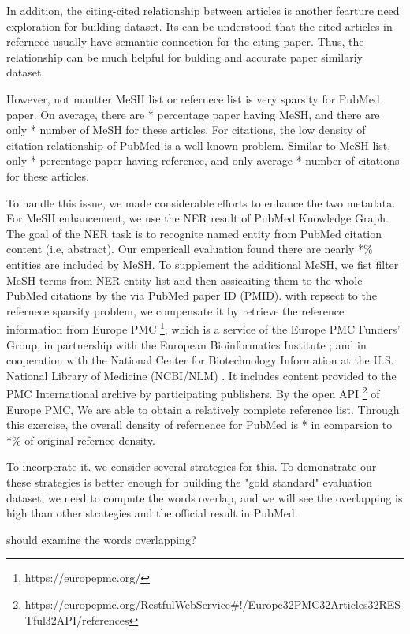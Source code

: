 \documentclass[11pt]{article}
\begin{document}
    In addition, the citing-cited relationship between articles is another fearture need exploration for building dataset. Its can be understood that the cited articles in refernece usually have semantic connection for the citing paper.
    Thus, the relationship can be much helpful for bulding and accurate paper similariy dataset.

    However, not mantter MeSH list or refernece list is very sparsity for PubMed paper. On average, there are * percentage paper having MeSH, and there are only * number of MeSH for these articles.
    For citations, the low density of citation relationship of PubMed is a well known problem. Similar to MeSH list, only * percentage paper having reference, and only average * number of citations for these articles.

    To handle this issue, we made considerable efforts to enhance the two metadata. For MeSH enhancement, we use the NER result of PubMed Knowledge Graph\cite{xu2020building}. The goal of the NER task is to recognite named entity from PubMed citation content (i.e, abstract).
    Our empericall evaluation found there are nearly *\% entities are included by MeSH. To supplement the additional MeSH, we fist filter MeSH terms from NER entity list and then assicaiting them to the whole PubMed citations by the via PubMed paper ID (PMID).
    with repsect to the refernece sparsity problem, we compensate it by retrieve the reference information from Europe PMC \footnote{https://europepmc.org/}, which is a service of the Europe PMC Funders' Group, in partnership with the European Bioinformatics Institute ; and in cooperation with the National Center for Biotechnology Information at the U.S. National Library of Medicine (NCBI/NLM) . It includes content provided to the PMC International archive by participating publishers.
    By the open API \footnote{https://europepmc.org/RestfulWebService#!/Europe32PMC32Articles32RESTful32API/references} of Europe PMC, We are able to obtain a relatively complete reference list. Through this exercise, the overall density of refernence for PubMed is * in comparsion to *\% of original refernce density.

    To incorperate it. we consider several strategies for this.
    To demonstrate our these strategies is better enough for building the "gold standard" evaluation dataset, we need to compute the words overlap, and we will see the overlapping is high than other strategies and the official result in PubMed.

    should examine the words overlapping?
\end{document}
